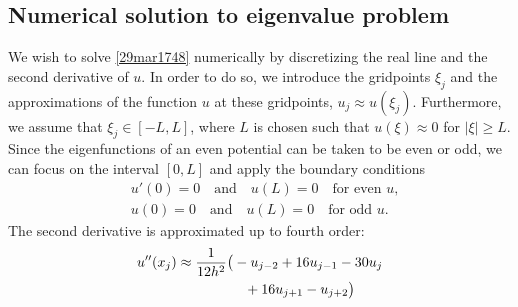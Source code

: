 \documentclass[twocolumn]{article}
\begin{document}
\begin{large}
\subsection*{Numerical solution to eigenvalue problem}
We wish to solve \eqref{29mar1748} numerically by discretizing the real line and the second derivative of $u$. In order to do so, we introduce the gridpoints $\xi_j$  and the approximations of the function $u$ at these gridpoints, $u_j\approx u(\xi_j)$. Furthermore, we assume that $\xi_j\in[-L,L]$, where $L$ is chosen such that $u(\xi)\approx 0$ for $|\xi|\geq L$. Since the eigenfunctions of an even potential can be taken to be even or odd, we can focus on the interval $[0,L]$ and apply the boundary conditions 
\begin{equation}
    \begin{split}
        &u'(0) = 0 \quad\text{and}\quad u(L) = 0 \quad \text{for even } u, \\ 
        &u(0) = 0 \quad\text{and}\quad u(L) = 0 \quad \text{for odd } u.
    \end{split}
\end{equation} 
The second derivative is approximated up to fourth order:
\begin{equation}
    \begin{split}
        u''(x_j) &\approx \frac{1}{12h^2}\big(-u_{j-2}+16u_{j-1}-30u_j \\ 
        &\hspace{1.7cm}+16u_{j+1}-u_{j+2}\big) 
    \end{split}
\end{equation}


\end{large}
\end{document}
